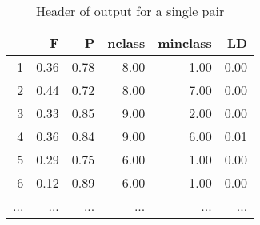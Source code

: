 \documentclass[paper=a4, fontsize=11pt]{scrartcl}         %
\numberwithin{equation}{section}                  %
\numberwithin{figure}{section}                    %
\numberwithin{table}{section}                   %
\begin{document}
\begin{landscape}

\begin{table}[ht]
\centering
\begin{tabular}{rrrrrr}
  \hline
 & F & P & nclass & minclass & LD \\ 
  \hline
1 & 0.36 & 0.78 & 8.00 & 1.00 & 0.00 \\ 
  2 & 0.44 & 0.72 & 8.00 & 7.00 & 0.00 \\ 
  3 & 0.33 & 0.85 & 9.00 & 2.00 & 0.00 \\ 
  4 & 0.36 & 0.84 & 9.00 & 6.00 & 0.01 \\ 
  5 & 0.29 & 0.75 & 6.00 & 1.00 & 0.00 \\ 
  6 & 0.12 & 0.89 & 6.00 & 1.00 & 0.00 \\
  ... & ... & ... & ... & ...& ... \\ 
   \hline
\end{tabular}
\caption*{Header of output for a single pair}
\end{table}

\vspace{2cm}



\end{landscape}
\end{document}
